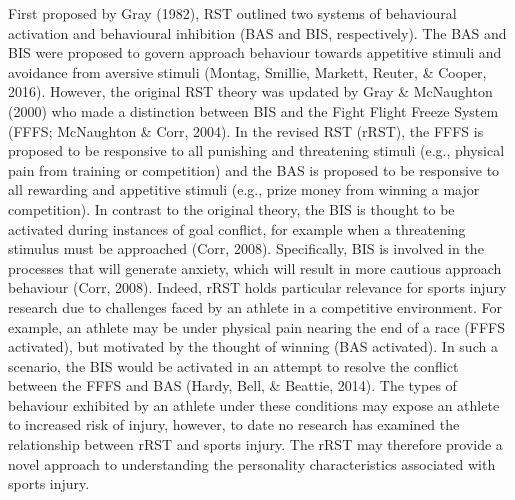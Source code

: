 \documentclass[
  english,
  man,floatsintext]{apa6}
\begin{document}
First proposed by Gray (1982), RST outlined two systems of behavioural activation and behavioural inhibition (BAS and BIS, respectively).
The BAS and BIS were proposed to govern approach behaviour towards appetitive stimuli and avoidance from aversive stimuli (Montag, Smillie, Markett, Reuter, \& Cooper, 2016).
However, the original RST theory was updated by Gray \& McNaughton (2000) who made a distinction between BIS and the Fight Flight Freeze System (FFFS; McNaughton \& Corr, 2004).
In the revised RST (rRST), the FFFS is proposed to be responsive to all punishing and threatening stimuli (e.g., physical pain from training or competition) and the BAS is proposed to be responsive to all rewarding and appetitive stimuli (e.g., prize money from winning a major competition).
In contrast to the original theory, the BIS is thought to be activated during instances of goal conflict, for example when a threatening stimulus must be approached (Corr, 2008).
Specifically, BIS is involved in the processes that will generate anxiety, which will result in more cautious approach behaviour (Corr, 2008).
Indeed, rRST holds particular relevance for sports injury research due to challenges faced by an athlete in a competitive environment.
For example, an athlete may be under physical pain nearing the end of a race (FFFS activated), but motivated by the thought of winning (BAS activated).
In such a scenario, the BIS would be activated in an attempt to resolve the conflict between the FFFS and BAS (Hardy, Bell, \& Beattie, 2014).
The types of behaviour exhibited by an athlete under these conditions may expose an athlete to increased risk of injury, however, to date no research has examined the relationship between rRST and sports injury.
The rRST may therefore provide a novel approach to understanding the personality characteristics associated with sports injury.
\end{document}
